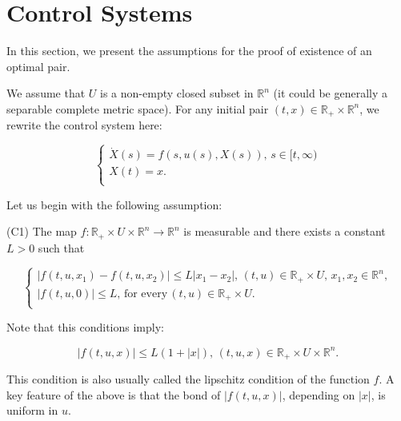 \section{Control Systems}

In this section, we present the assumptions for the proof of existence of an optimal pair.

We assume that $U$ is a non-empty closed subset in $\mathbb{R}^n$ (it could be generally a separable complete metric space). For any initial pair $(t,x)\in \mathbb{R}_{+}\times\mathbb{R}^n$, we rewrite the control system here:

\begin{equation}\label{eq2.1}
	\left\{ \begin{array}{l}
	\dot{X}(s)=f(s,u(s),X(s)),\, s\in [t,\infty) \\
	X(t)=x.\\
	\end{array}
	\right.
\end{equation}

Let us begin with the following assumption:

(C1) The map $f:\mathbb{R}_{+}\times U\times \mathbb{R}^n\rightarrow \mathbb{R}^n$ is measurable and there exists a constant $L>0$ such that

$$\left\{ \begin{array}{l}
	|f(t,u,x_1)-f(t,u,x_2)|\leq L|x_1-x_2|,\, (t,u)\in \mathbb{R}_{+}\times U,\, x_1,x_2\in \mathbb{R}^n,\\
	|f(t,u,0)|\leq L,\,\mbox{for every}\,(t,u)\in \mathbb{R}_{+}\times U .\\
\end{array}
\right.$$

Note that this conditions imply:

$$|f(t,u,x)|\leq L(1+|x|),\,(t,u,x)\in\mathbb{R}_{+}\times U\times \mathbb{R}^n.$$

This condition is also usually called the lipschitz condition of the function $f$. A key feature of the above is that the bond of $|f(t,u,x)|$, depending on $|x|$, is uniform in $u$.

